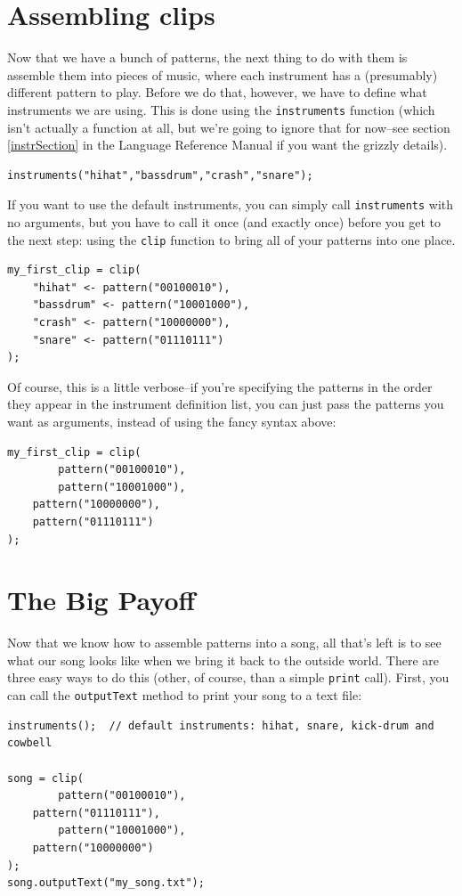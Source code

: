 \section{Assembling clips}

Now that we have a bunch of patterns, the next thing to do with them is assemble them into pieces of music, where each instrument has a (presumably) different pattern to play.  Before we do that, however, we have to define what instruments we are using.  This is done using the {\tt instruments} function (which isn't actually a function at all, but we're going to ignore that for now--see section \ref{instrSection} in the Language Reference Manual if you want the grizzly details).
\begin{lstlisting}
instruments("hihat","bassdrum","crash","snare");
\end{lstlisting}
If you want to use the default instruments, you can simply call {\tt instruments} with no arguments, but you have to call it once (and exactly once) before you get to the next step: using the {\tt clip} function to bring all of your patterns into one place.
\begin{lstlisting}
my_first_clip = clip(
    "hihat" <- pattern("00100010"),
    "bassdrum" <- pattern("10001000"),
    "crash" <- pattern("10000000"),
    "snare" <- pattern("01110111")
);
\end{lstlisting}
Of course, this is a little verbose--if you're specifying the patterns in the order they appear in the instrument definition list, you can just pass the patterns you want as arguments, instead of using the fancy syntax above:
\begin{lstlisting}
my_first_clip = clip(
    	pattern("00100010"),
    	pattern("10001000"),
	pattern("10000000"),
	pattern("01110111")
);
\end{lstlisting}

\section{The Big Payoff}
Now that we know how to assemble patterns into a song, all that's left is to see what our song looks like 
when we bring it back to the outside world.  There are three easy ways to do this (other, of course, than a simple {\tt print} call).  First, you can call the {\tt outputText} method to print your song to a text file:
\begin{lstlisting}
instruments();  // default instruments: hihat, snare, kick-drum and cowbell

song = clip(
    	pattern("00100010"),
	pattern("01110111"),
    	pattern("10001000"),
	pattern("10000000")
);
song.outputText("my_song.txt");
\end{lstlisting}


